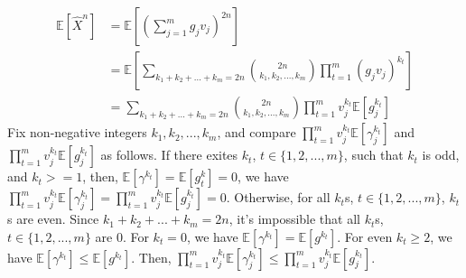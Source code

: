 \begin{align}
    \nonumber \mathbb{E}[\widehat{X}^n]&=\mathbb{E}\left[\left(\sum_{j=1}^{m}g_jv_j\right)^{2n}\right]\\
    \nonumber &=\mathbb{E}\left[\sum_{k_1+k_2+...+k_m=2n}\binom{2n}{k_1,k_2,...,k_m}\prod_{t=1}^{m}(g_jv_j)^{k_t} \right]\\
    \nonumber &=\sum_{k_1+k_2+...+k_m=2n}\binom{2n}{k_1,k_2,...,k_m}\prod_{t=1}^{m}v_j^{k_t}\mathbb{E}\left[g_j^{k_t}\right]
\end{align}
Fix non-negative integers $k_1,k_2,...,k_m$, and compare  $\prod_{t=1}^{m}v_j^{k_t}\mathbb{E}\left[\gamma_j^{k_t}\right]$ and $\prod_{t=1}^{m}v_j^{k_t}\mathbb{E}\left[g_j^{k_t}\right]$ as follows.
If there exites $k_t$, $t\in\{1,2,...,m\}$, such that $k_t$ is odd, and $k_t>=1$, then, $\mathbb{E}[\gamma^{k_t}]=\mathbb{E}[g^k_t]=0$, we have $\prod_{t=1}^{m}v_j^{k_t}\mathbb{E}\left[\gamma_j^{k_t}\right]=\prod_{t=1}^{m}v_j^{k_t}\mathbb{E}\left[g_j^{k_t}\right]=0$.
Otherwise, for all $k_t$s, $t\in\{1,2,...,m\}$, $k_t$s are even. 
Since $k_1+k_2+...+k_m=2n$, it's impossible that all $k_t$s, $t\in \{1,2,...,m\}$ are 0.
For $k_t=0$, we have $\mathbb{E}[\gamma^{k_t}]=\mathbb{E}[g^{k_t}]$.
For even $k_t\ge 2$, we have $\mathbb{E}[\gamma^{k_t}]\le\mathbb{E}[g^{k_t}]$. 
Then, $\prod_{t=1}^{m}v_j^{k_t}\mathbb{E}\left[\gamma_j^{k_t}\right]\le \prod_{t=1}^{m}v_j^{k_t}\mathbb{E}\left[g_j^{k_t}\right]$.

